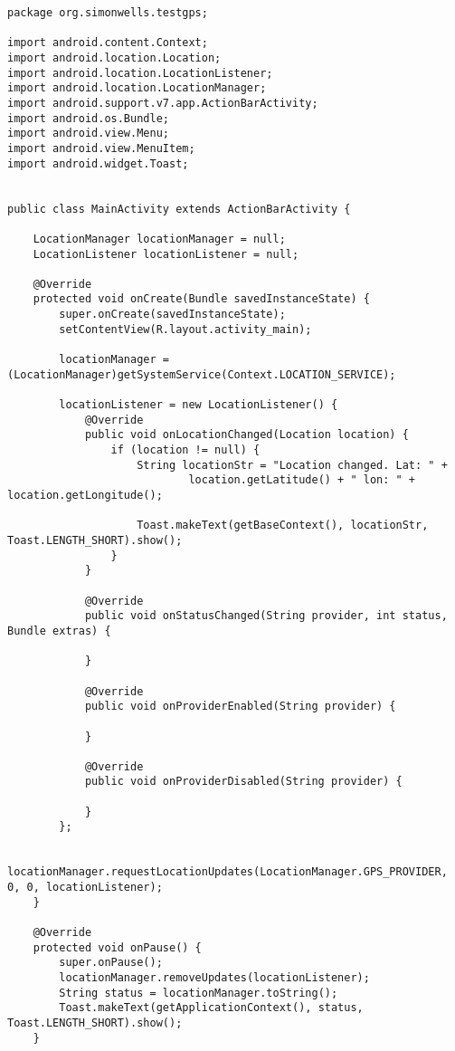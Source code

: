 \begin{lstlisting}
package org.simonwells.testgps;

import android.content.Context;
import android.location.Location;
import android.location.LocationListener;
import android.location.LocationManager;
import android.support.v7.app.ActionBarActivity;
import android.os.Bundle;
import android.view.Menu;
import android.view.MenuItem;
import android.widget.Toast;


public class MainActivity extends ActionBarActivity {

    LocationManager locationManager = null;
    LocationListener locationListener = null;

    @Override
    protected void onCreate(Bundle savedInstanceState) {
        super.onCreate(savedInstanceState);
        setContentView(R.layout.activity_main);

        locationManager = (LocationManager)getSystemService(Context.LOCATION_SERVICE);

        locationListener = new LocationListener() {
            @Override
            public void onLocationChanged(Location location) {
                if (location != null) {
                    String locationStr = "Location changed. Lat: " +
                            location.getLatitude() + " lon: " + location.getLongitude();

                    Toast.makeText(getBaseContext(), locationStr, Toast.LENGTH_SHORT).show();
                }
            }

            @Override
            public void onStatusChanged(String provider, int status, Bundle extras) {

            }

            @Override
            public void onProviderEnabled(String provider) {

            }

            @Override
            public void onProviderDisabled(String provider) {

            }
        };

        locationManager.requestLocationUpdates(LocationManager.GPS_PROVIDER, 0, 0, locationListener);
    }

    @Override
    protected void onPause() {
        super.onPause();
        locationManager.removeUpdates(locationListener);
        String status = locationManager.toString();
        Toast.makeText(getApplicationContext(), status, Toast.LENGTH_SHORT).show();
    }



\end{lstlisting}
